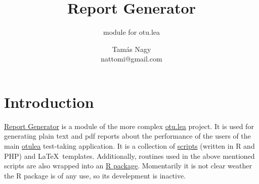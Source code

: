 \documentclass{scrartcl}
\title{Report Generator}
\subtitle{module for otu.lea}
\author{Tamás Nagy\\ \small nattomi@gmail.com}
\begin{document}
\maketitle
\tableofcontents
\section{Introduction}
\href{http://github.com/nattomi/otulear}{Report Generator} is a module of the more complex \href{http://workforce.zmml.uni-bremen.de}{otu.lea} project. It is used for generating plain text and pdf reports about the performance of the users of the main \href{http://www.ifeb.uni-bremen.de/otulea/reaApplication.html}{otulea} test-taking application. It is a collection of \href{http://github.com/nattomi/otulear/tree/master/scripts}{scripts} (written in R and PHP) and \LaTeX\ templates. Additionally, routines used in the above mentioned scripts are also wrapped into an \href{http://github.com/nattomi/otulear/tree/master/otulea}{R package}. Momentarily it is not clear weather the R package is of any use, so its develepment is inactive. 
\end{document}
